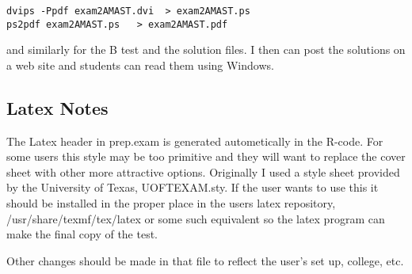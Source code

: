 \documentclass{article}
\begin{document}
\begin{verbatim}
dvips -Ppdf exam2AMAST.dvi  > exam2AMAST.ps
ps2pdf exam2AMAST.ps   > exam2AMAST.pdf
\end{verbatim}
and similarly for the B test and the solution files.
I then can post the solutions on a web site and
students can read them using Windows.




\subsection{Latex Notes}

The Latex header in prep.exam
is generated autometically in 
the R-code.  For some users this
style may be too primitive and
they will want to replace the 
cover sheet with other more attractive
options.  Originally I used
a style sheet provided by
the University of Texas, UOFTEXAM.sty.
If the user wants to 
use this it should be installed in the 
proper place in
the users latex repository, /usr/share/texmf/tex/latex
or some such equivalent so
the latex program can make the final copy of the 
test.

Other changes should be made in that 
file to reflect the user's set up,
college, etc.
\end{document}
